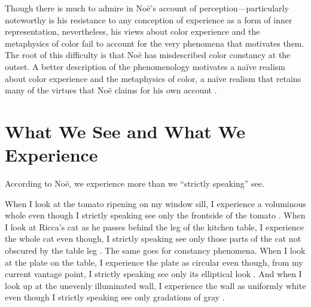 \documentclass[12pt]{article}
\begin{document}
Though there is much to admire in Noë's account of perception---particularly noteworthy is his resistance to any conception of experience as a form of inner representation, nevertheless, his views about color experience and the metaphysics of color fail to account for the very phenomena that motivates them. The root of this difficulty is that Noë has misdescribed color constancy at the outset. A better description of the phenomenology motivates a naïve realism about color experience and the metaphysics of color, a naïve realism that retains many of the virtues that Noë claims for his own account \citep[see][for similar suggestions]{Allen:2008kx,Campbell:2008nx}.


\section{What We See and What We Experience}\label{sec:the_problem_of_perceptual_presence} %

According to Noë, we experience more than we ``strictly speaking'' see. 

When I look at the tomato ripening on my window sill, I experience a voluminous whole even though I strictly speaking see only the frontside of the tomato \citep[76]{Noe:2004fk}. When I look at Ricca's cat as he passes behind the leg of the kitchen table, I experience the whole cat even though, I strictly speaking see only those parts of the cat not obscured by the table leg \citep[60]{Noe:2004fk}. The same goes for constancy phenomena. When I look at the plate on the table, I experience the plate as circular even though, from my current vantage point, I strictly speaking see only its elliptical look \citep[78--79]{Noe:2004fk}. And when I look up at the unevenly illuminated wall, I experience the wall as uniformly white even though I strictly speaking see only gradations of gray \citep[127]{Noe:2004fk}. 
\end{document}
